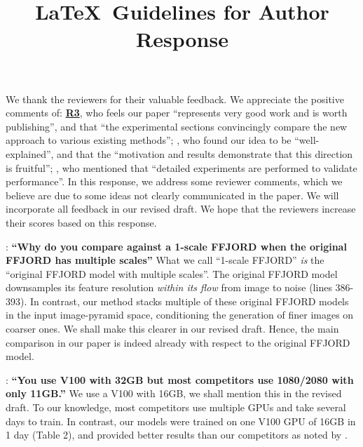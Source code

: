\documentclass[rebuttal]{cvpr}
\begin{document}
\title{\LaTeX\ Guidelines for Author Response}  

\thispagestyle{empty}





\newcommand{\ra}{\dotuline{\textcolor{r1color}{\textbf{R1}}}}
\newcommand{\rb}{\uwave{\textcolor{r2color}{\textbf{R2}}}}
\newcommand{\rc}{\uline{\textcolor{r3color}{\textbf{R3}}}}
\newcommand{\rd}{\dashuline{\textcolor{r4color}{\textbf{R4}}}}



We thank the reviewers for their valuable feedback. We appreciate the positive comments of: \rc{}, who feels our paper “represents very good work and is worth publishing”, and that “the experimental sections convincingly compare the new approach to various existing methods”; \rb{}, who found our idea to be “well-explained”, and that the “motivation and results demonstrate that this direction is fruitful”; \ra{}, who mentioned that “detailed experiments are performed to validate performance”. In this response, we address some reviewer comments, which we believe are due to some ideas not clearly communicated in the paper. We will incorporate all feedback in our revised draft. We hope that the reviewers increase their scores based on this response.

\rb : \textbf{“Why do you compare against a 1-scale FFJORD when the original FFJORD has multiple scales”}
What we call “1-scale FFJORD” \textit{is} the “original FFJORD model with multiple scales”. The original FFJORD model downsamples its feature resolution \textit{within its flow} from image to noise (lines 386-393). In contrast, our method stacks multiple of these original FFJORD models in the input image-pyramid space, conditioning the generation of finer images on coarser ones. We shall make this clearer in our revised draft. Hence, the main comparison in our paper is indeed already with respect to the original FFJORD model.

\rb : \textbf{“You use V100 with 32GB but most competitors use 1080/2080 with only 11GB.”}
We use a V100 with 16GB, we shall mention this in the revised draft. To our knowledge, most competitors use multiple GPUs and take several days to train. In contrast, our models were trained on one V100 GPU of 16GB in 1 day (Table 2), and provided better results than our competitors as noted by \rb{}.
\end{document}
